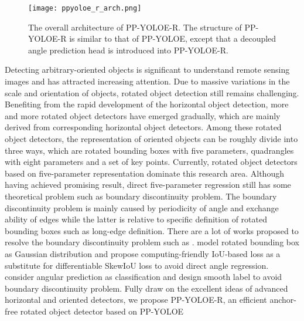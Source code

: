 \documentclass[final]{cvpr}
\begin{document}
\begin{figure*}[ht]
	\centering
	\texttt{[image: ppyoloe\_r\_arch.png]}
	\caption{The overall architecture of PP-YOLOE-R. The structure of PP-YOLOE-R is similar to that of PP-YOLOE, except that a decoupled angle prediction head is introduced into PP-YOLOE-R.}
	\label{figure2}
\end{figure*}

Detecting arbitrary-oriented objects is significant to understand remote sensing images and has attracted increasing attention. Due to massive variations in the scale and orientation of objects, rotated object detection still remains challenging. Benefiting from the rapid development of the horizontal object detection, more and more rotated object detectors\cite{ding2019learning, guo2021beyond,  han2021redet, yang2021r3det, han2021align, ming2021dynamic, li2021fcosr, lang2021dafne, hou2022shape, li2022oriented, xie2021oriented} have emerged gradually, which are mainly derived from corresponding horizontal object detectors\cite{lin2017focal, ren2015faster, tian2019fcos, yang2019reppoints}. Among these rotated object detectors, the representation of oriented objects can be roughly divide into three ways, which are rotated bounding boxes with five parameters, quadrangles with eight parameters and a set of key points. Currently, rotated object detectors based on five-parameter representation dominate this research area. Although having achieved promising result, direct five-parameter regression still has some theoretical problem such as boundary discontinuity problem\cite{yang2021dense, yang2020arbitrary, yang2021rethinking}.
The boundary discontinuity problem is mainly caused by periodicity of angle and exchange ability of edges while the latter is relative to specific definition of rotated bounding boxes such as long-edge definition. There are a lot of works proposed to resolve the boundary discontinuity problem such as \cite{llerena2021gaussian, yang2021rethinking, yang2021learning, yang2022kfiou, yang2021dense, yang2020arbitrary}. \cite{llerena2021gaussian, yang2021rethinking, yang2021learning, yang2022kfiou} model rotated bounding box as Gaussian distribution and propose computing-friendly IoU-based loss as a substitute for differentiable SkewIoU loss to avoid direct angle regression. \cite{yang2021dense, yang2020arbitrary} consider angular prediction as classification and design smooth label to avoid boundary discontinuity problem. Fully draw on the excellent ideas of advanced horizontal and oriented detectors, we propose PP-YOLOE-R, an efficient anchor-free rotated object detector based on PP-YOLOE\cite{xu2022pp}
\end{document}
